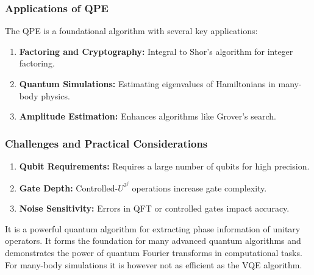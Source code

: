 \documentclass{beamer}
\begin{document}
\begin{frame}
\frametitle{Applications of QPE}

The QPE is a foundational algorithm with several key applications:
\begin{enumerate}
\item \textbf{Factoring and Cryptography:} Integral to Shor's algorithm for integer factoring.

\item \textbf{Quantum Simulations:} Estimating eigenvalues of Hamiltonians in many-body physics.

\item \textbf{Amplitude Estimation:} Enhances algorithms like Grover's search.
\end{enumerate}

\noindent
\end{frame}

\begin{frame}
\frametitle{Challenges and Practical Considerations}

\begin{enumerate}
\item \textbf{Qubit Requirements:} Requires a large number of qubits for high precision.

\item \textbf{Gate Depth:} Controlled-$U^{2^j}$ operations increase gate complexity.

\item \textbf{Noise Sensitivity:} Errors in QFT or controlled gates impact accuracy.
\end{enumerate}

\noindent
It is a powerful quantum algorithm for extracting phase information of
unitary operators. It forms the foundation for many advanced quantum
algorithms and demonstrates the power of quantum Fourier transforms in
computational tasks. For many-body simulations it is however not as efficient as the VQE algorithm.
\end{frame}
\end{document}

